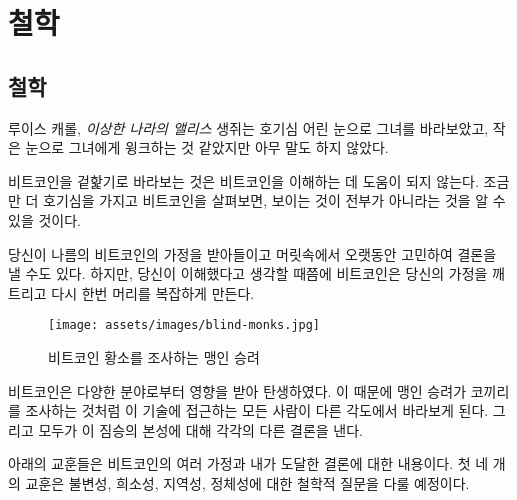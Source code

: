 \part{철학}
\label{ch:philosophy}
\chapter*{철학}

\begin{chapquote}{루이스 캐롤, \textit{이상한 나라의 앨리스}}
	생쥐는 호기심 어린 눈으로 그녀를 바라보았고, 작은 눈으로 그녀에게 윙크하는 것 같았지만 아무 말도 하지 않았다.
\end{chapquote}

비트코인을 겉핥기로 바라보는 것은 비트코인을 이해하는 데 도움이 되지 않는다. 조금만 더 호기심을 가지고 비트코인을 살펴보면, 보이는 것이 
전부가 아니라는 것을 알 수 있을 것이다.

당신이 나름의 비트코인의 가정을 받아들이고 머릿속에서 오랫동안 고민하여 결론을 낼 수도 있다. 하지만,
당신이 이해했다고 생각할 때쯤에 비트코인은 당신의 가정을 깨트리고 다시 한번 머리를 복잡하게 만든다.

\begin{figure}
	\texttt{[image: assets/images/blind-monks.jpg]}
	\caption{비트코인 황소를 조사하는 맹인 승려}
	\label{fig:blind-monks}
\end{figure}

비트코인은 다양한 분야로부터 영향을 받아 탄생하였다. 
이 때문에 맹인 승려가 코끼리를 조사하는 것처럼 이 기술에 접근하는 모든 사람이 다른 각도에서 바라보게 된다. 
그리고 모두가 이 짐승의 본성에 대해 각각의 다른 결론을 낸다.

아래의 교훈들은 비트코인의 여러 가정과 내가 도달한 결론에 대한 내용이다. 첫 네 개의 교훈은
불변성, 희소성, 지역성, 정체성에 대한 철학적 질문을 다룰 예정이다.

